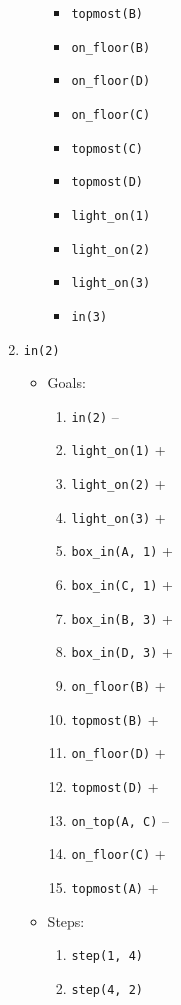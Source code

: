 \documentclass[12pt]{article}
\begin{document}
\begin{enumerate}
\begin{itemize}
\begin{itemize}
          \item \texttt{topmost(B)}
          \item \texttt{on\_floor(B)}
          \item \texttt{on\_floor(D)}
          \item \texttt{on\_floor(C)}
          \item \texttt{topmost(C)}
          \item \texttt{topmost(D)}
          \item \texttt{light\_on(1)}
          \item \texttt{light\_on(2)}
          \item \texttt{light\_on(3)}
          \item \texttt{in(3)}
        \end{itemize}
    \end{itemize}
  \item \texttt{in(2)}
    \begin{itemize}
      \item Goals:
        \begin{enumerate}
          \item \texttt{in(2)} --
          \item \texttt{light\_on(1)} +
          \item \texttt{light\_on(2)} +
          \item \texttt{light\_on(3)} +
          \item \texttt{box\_in(A, 1)} +
          \item \texttt{box\_in(C, 1)} +
          \item \texttt{box\_in(B, 3)} +
          \item \texttt{box\_in(D, 3)} +
          \item \texttt{on\_floor(B)} +
          \item \texttt{topmost(B)} +
          \item \texttt{on\_floor(D)} +
          \item \texttt{topmost(D)} +
          \item \texttt{on\_top(A, C)} --
          \item \texttt{on\_floor(C)} +
          \item \texttt{topmost(A)} +
        \end{enumerate}
      \item Steps:
        \begin{enumerate}
          \item \texttt{step(1, 4)}
          \item \texttt{step(4, 2)}

\end{enumerate}
\end{itemize}
\end{enumerate}
\end{document}
